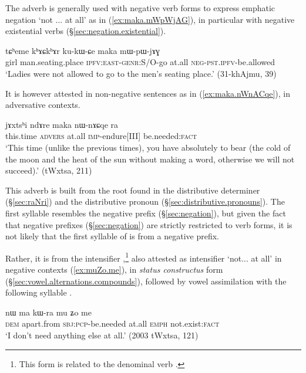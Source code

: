 The adverb  is generally used with negative verb forms to express emphatic negation `not ... at all' as in (\ref{ex:maka.mWpWjAG}), in particular with negative existential verbs (§\ref{sec:negation.existential}).

\begin{exe}
	\ex \label{ex:maka.mWpWjAG}
	\gll   tɕʰeme kʰɤɕkʰɤr ku-kɯ-ɕe maka mɯ-pɯ-jɤɣ \\
	girl man.seating.place \textsc{ipfv}:\textsc{east}-\textsc{genr}:S/O-go at.all \textsc{neg}-\textsc{pst}.\textsc{ipfv}-be.allowed \\
	\glt `Ladies were not allowed to go to the men's seating place.' (31-khAjmu, 39)
\end{exe} 

It is however attested in non-negative sentences as in (\ref{ex:maka.nWnACqe}), in adversative contexts.

\begin{exe}
	\ex \label{ex:maka.nWnACqe}
	\gll  jɤxtsʰi ndɤre maka nɯ-nɤɕqe ra \\
	this.time \textsc{advers} at.all \textsc{imp}-endure[III] be.needed:\textsc{fact} \\
	\glt `This time (unlike the previous times), you have absolutely to bear (the cold of the moon and the heat of the sun without making a word, otherwise we will not succeed).' (tWxtsa, 211)
\end{exe} 

This adverb is built from the root  found in the distributive determiner   (§\ref{sec:raNri}) and the distributive pronoun    (§\ref{sec:distributive.pronouns}). The first syllable  resembles the negative prefix  (§\ref{sec:negation}), but given the fact that negative prefixes (§\ref{sec:negation}) are strictly restricted to verb forms, it is not likely that the first syllable of  is from a negative prefix.

Rather, it is from the intensifier ,\footnote{This form is related to the denominal verb .  } also attested as intensifier `not... at all' in negative contexts (\ref{ex:muZo.me}), in \textit{status constructus} form  (§\ref{sec:vowel.alternations.compounds}), followed by vowel assimilation with the following syllable .

\begin{exe}
	\ex \label{ex:muZo.me}
	\gll  nɯ ma kɯ-ra mu ʑo me \\
	\textsc{dem} apart.from \textsc{sbj}:\textsc{pcp}-be.needed at.all \textsc{emph} not.exist:\textsc{fact} \\
	\glt `I don't need anything else at all.' (2003 tWxtsa, 121)
\end{exe} 

